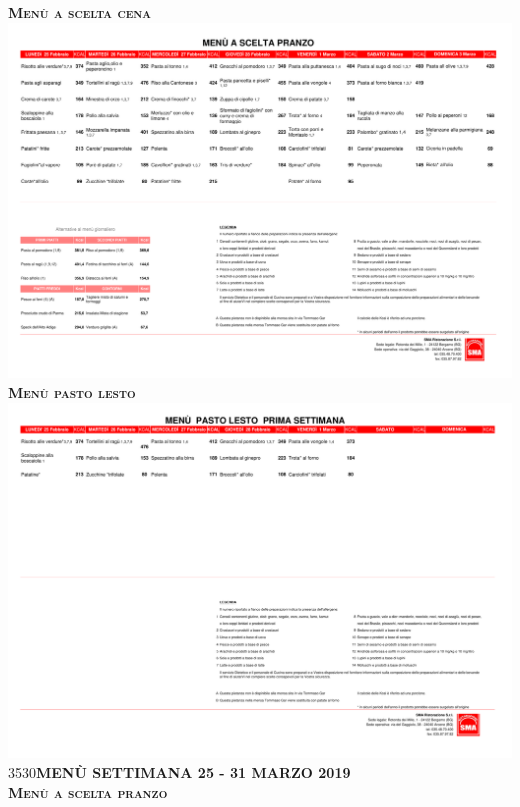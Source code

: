 \documentclass{article}
\makeatletter
\newcommand\HUGE{\@setfontsize\Huge{35}{30}}
\newcommand{\frasecinque}{MENÙ SETTIMANA 25 - 31 MARZO 2019}
\makeatother
\begin{document}
\begin{center}
\vspace{0.3cm}
{\Huge \textbf{\textsc{Menù a scelta cena}}}\\
\includegraphics[trim=0cm 17.3cm 0cm 2.2cm,clip,page=8,width=\textwidth,]{scelta.pdf}
\vspace{0.3cm}
{\Huge \textbf{\textsc{Menù pasto lesto}}}\\
\includegraphics[trim=0cm 23cm 0cm 2cm,clip,page=4,width=\textwidth,]{lesto.pdf}
\newpage
{\HUGE \color{red}\textbf{\frasecinque}}\\
\vspace{0.7cm}
{\Huge \textbf{\textsc{Menù a scelta pranzo}}}\\

\end{center}
\end{document}
